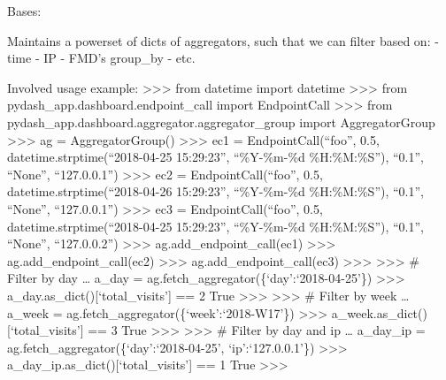 \documentclass[letterpaper,10pt,english]{sphinxmanual}
\begin{document}
\begin{fulllineitems}
\label{\detokenize{pydash_app.dashboard.aggregator.aggregator_group:pydash_app.dashboard.aggregator.aggregator_group.AggregatorGroup}}
Bases: 

Maintains a powerset of dicts of aggregators,
such that we can filter based on:
- time
- IP
- FMD’s group\_by
- etc.

Involved usage example:
\textgreater{}\textgreater{}\textgreater{} from datetime import datetime
\textgreater{}\textgreater{}\textgreater{} from pydash\_app.dashboard.endpoint\_call import EndpointCall
\textgreater{}\textgreater{}\textgreater{} from pydash\_app.dashboard.aggregator.aggregator\_group import AggregatorGroup
\textgreater{}\textgreater{}\textgreater{} ag = AggregatorGroup()
\textgreater{}\textgreater{}\textgreater{} ec1 = EndpointCall(“foo”, 0.5, datetime.strptime(“2018-04-25 15:29:23”, “\%Y-\%m-\%d \%H:\%M:\%S”), “0.1”, “None”, “127.0.0.1”)
\textgreater{}\textgreater{}\textgreater{} ec2 = EndpointCall(“foo”, 0.5, datetime.strptime(“2018-04-26 15:29:23”, “\%Y-\%m-\%d \%H:\%M:\%S”), “0.1”, “None”, “127.0.0.1”)
\textgreater{}\textgreater{}\textgreater{} ec3 = EndpointCall(“foo”, 0.5, datetime.strptime(“2018-04-25 15:29:23”, “\%Y-\%m-\%d \%H:\%M:\%S”), “0.1”, “None”, “127.0.0.2”)
\textgreater{}\textgreater{}\textgreater{} ag.add\_endpoint\_call(ec1)
\textgreater{}\textgreater{}\textgreater{} ag.add\_endpoint\_call(ec2)
\textgreater{}\textgreater{}\textgreater{} ag.add\_endpoint\_call(ec3)
\textgreater{}\textgreater{}\textgreater{}
\textgreater{}\textgreater{}\textgreater{} \# Filter by day
… a\_day = ag.fetch\_aggregator(\{‘day’:‘2018-04-25’\})
\textgreater{}\textgreater{}\textgreater{} a\_day.as\_dict(){[}‘total\_visits’{]} == 2
True
\textgreater{}\textgreater{}\textgreater{}
\textgreater{}\textgreater{}\textgreater{} \# Filter by week
… a\_week = ag.fetch\_aggregator(\{‘week’:‘2018-W17’\})
\textgreater{}\textgreater{}\textgreater{} a\_week.as\_dict(){[}‘total\_visits’{]} == 3
True
\textgreater{}\textgreater{}\textgreater{}
\textgreater{}\textgreater{}\textgreater{} \# Filter by day and ip
… a\_day\_ip = ag.fetch\_aggregator(\{‘day’:‘2018-04-25’, ‘ip’:‘127.0.0.1’\})
\textgreater{}\textgreater{}\textgreater{} a\_day\_ip.as\_dict(){[}‘total\_visits’{]} == 1
True
\textgreater{}\textgreater{}\textgreater{}

\end{fulllineitems}
\end{document}

